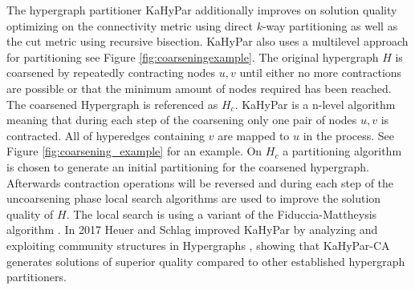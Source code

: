 \documentclass[a4paper,12pt,titlepage, BCOR7mm,headsepline]{scrbook}
\numberwithin{equation}{section}
\begin{document}
The hypergraph partitioner KaHyPar additionally improves on solution quality optimizing on the connectivity metric using direct $k$-way partitioning \cite{akhremtsev2017engineering} as well as the cut metric using recursive bisection\cite{schlag2016k}.  
KaHyPar also uses a multilevel approach for partitioning see Figure \ref{fig:coarseningexample}. The original hypergraph $H$ is coarsened by repeatedly contracting nodes $u,v$ until either no more contractions are possible or that the minimum amount of nodes required has been reached. The coarsened Hypergraph is referenced as $H_c$. KaHyPar is a n-level algorithm meaning that during each step of the coarsening only one pair of nodes $u, v$ is contracted. All of hyperedges containing $v$ are mapped to $u$ in the process. See Figure \ref{fig:coarsening_example} for an example. 
On $H_c$ a partitioning algorithm is chosen to generate an initial partitioning for the coarsened hypergraph. Afterwards contraction operations will be reversed and 
during each step of the uncoarsening phase local search algorithms are used to improve the solution quality of $H$. The local search is using a variant of the Fiduccia-Mattheysis algorithm \cite{fiduccia1988linear}. 
In 2017 Heuer and Schlag improved KaHyPar by analyzing and exploiting community structures in Hypergraphs \cite{heuer2017improving}, showing that KaHyPar-CA generates solutions of superior quality compared to other established hypergraph partitioners.
\newline
\end{document}
